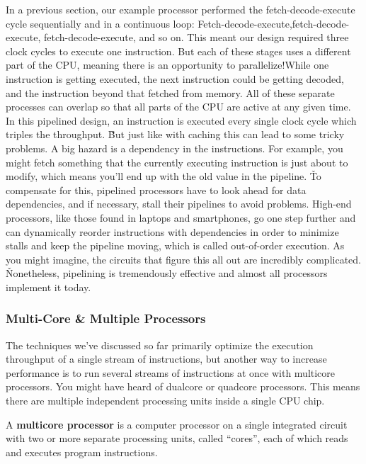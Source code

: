 In a previous section, our example processor performed the fetch-decode-execute cycle sequentially and in a
continuous loop: Fetch-decode-execute,fetch-decode-execute, fetch-decode-execute, and so on. This meant our design
required three clock cycles to execute one instruction. But each of these stages uses a different part of the CPU,
meaning there is an opportunity to parallelize!While one instruction is getting executed,  the next instruction could
be getting decoded, and the instruction beyond that fetched from memory. All of these separate processes can overlap
so that all parts of the CPU are active at any given time. In this pipelined design, an instruction is executed every
single clock cycle which triples the throughput. \v

But just like with caching this can lead to some tricky problems. A big hazard is a dependency in the instructions.
For example, you might fetch something that the currently executing instruction is just about to modify, which means
you'll end up with the old value in the pipeline. \v

To compensate for this, pipelined processors have to look ahead for data dependencies, and if necessary, stall their
pipelines to avoid problems. High-end processors, like those found in laptops and smartphones, go one step further
and can dynamically reorder instructions with dependencies in order to minimize stalls and keep the pipeline moving,
which is called out-of-order execution. As you might imagine, the circuits that figure this all out are incredibly
complicated. \v

Nonetheless, pipelining is tremendously effective and almost all processors implement it today.

\subsubsection{Multi-Core \& Multiple Processors}

The techniques we've discussed so far primarily optimize the execution throughput of a single stream of instructions,
but another way to increase performance is to run several streams of instructions at once with multicore processors.
You might have heard of dualcore or quadcore processors. This means there are multiple independent processing units
inside a single CPU chip.

A \textbf{multicore processor} is a computer processor on a single integrated circuit with two or more separate
processing units, called ``cores'', each of which reads and executes program instructions.
\ed

